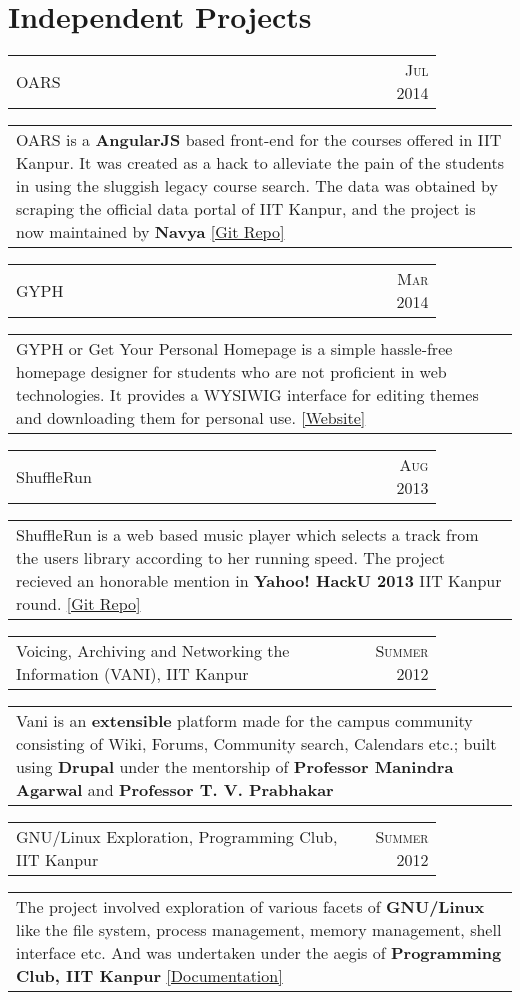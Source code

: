 \documentclass[a4paper,10pt]{article} %
\newcommand{\sideproject}[3]{
    \begin{tabular}{p{0.85\linewidth}r}
        \textcolor{NavyBlue}{#2} & \multicolumn{1}{m{3cm}}{\raggedleft \textsc{#1}}\\
    \end{tabular}
    \begin{tabular}{p{\linewidth}}
        \footnotesize{#3}
    \end{tabular}
    \vspace{-0.2cm}
}
\begin{document}
\section{Independent Projects}

\sideproject {Jul 2014}
             {OARS}
             {OARS is a \textbf{AngularJS} based front-end for the
              courses offered in IIT Kanpur. It was created as a
              hack to alleviate the pain of the students in using the
              sluggish legacy course search. The data was obtained by
              scraping the official data portal of IIT Kanpur, and the
              project is now maintained by \textbf{Navya}
              \href{https://github.com/navya/oars} {[Git Repo]} }

\sideproject {Mar 2014}
             {GYPH}
             {GYPH or Get Your Personal Homepage
              is a simple hassle-free homepage designer for students who are not
              proficient in web technologies. It provides a WYSIWIG
              interface for editing themes and downloading them for personal use.
              \href{http://gyph2.herokuapp.com/} {[Website]} }

\sideproject {Aug 2013}
             {ShuffleRun}
             {ShuffleRun is a web based music player which selects a track from the
              users library according to her running speed.
              The project recieved an honorable mention in \textbf{Yahoo!  HackU 2013} IIT Kanpur round.
              \href{https://github.com/srijanshetty/ShuffleRun} {[Git Repo]}}

\sideproject {Summer 2012}
             {Voicing, Archiving and Networking the Information \textsc{(VANI)}, IIT Kanpur}
             {Vani is an \textbf{extensible} platform
              made for the campus community consisting of Wiki, Forums,
              Community search, Calendars etc.; built using \textbf{Drupal}
              under the mentorship of \textbf{Professor Manindra Agarwal} and
              \textbf{Professor T. V. Prabhakar} }

\sideproject {Summer 2012}
             {GNU/Linux Exploration, Programming Club, IIT Kanpur}
             {The project involved exploration of various facets of
              \textbf{GNU/Linux} like the file system, process management,
              memory management, shell interface etc. And was
              undertaken under the aegis of \textbf{Programming Club, IIT Kanpur}
              \href{https://docs.google.com/document/d/1ZHO9w36aoq3oaZBR4Um1AOmDfiTDAEgM6baQAu3icw4/edit?usp=sharing}
              {[Documentation]} }
\end{document}
